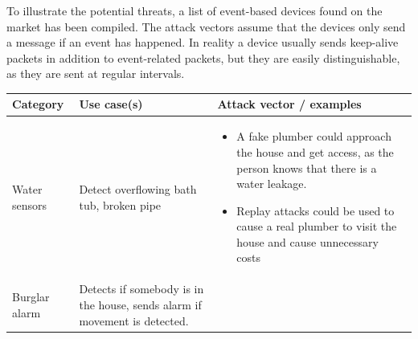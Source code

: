 {To illustrate the potential threats, a list of event-based devices
found on the market has been compiled. The attack vectors assume that
the devices only send a message if an event has happened. In reality a device usually sends keep-alive packets in addition to event-related packets, but they are easily distinguishable, as they are sent at regular intervals.

\begin{longtable}[c]{|l|l|l|}
\hline
\begin{minipage}[t]{0.20\columnwidth}\raggedright\strut
\textbf{Category}
\strut\end{minipage} &
\begin{minipage}[t]{0.30\columnwidth}\raggedright\strut
\textbf{Use case(s)}
\strut\end{minipage} &
\begin{minipage}[t]{0.40\columnwidth}\raggedright\strut
\textbf{Attack vector / examples}
\strut\end{minipage}\tabularnewline
\hline
\begin{minipage}[t]{0.20\columnwidth}\raggedright\strut
{Water sensors}
\strut\end{minipage} &
\begin{minipage}[t]{0.30\columnwidth}\raggedright\strut
{Detect overflowing bath tub, broken pipe}
\strut\end{minipage} &
\begin{minipage}[t]{0.40\columnwidth}\raggedright\strut
\begin{itemize}
\tightlist
\item
  {A fake plumber could approach the house and get access, as the person
  knows that there is a water leakage.}
\item
  {Replay attacks could be used to cause a real plumber to visit the
  house and cause unnecessary costs}
\end{itemize}
\strut\end{minipage}\tabularnewline
\hline
\begin{minipage}[t]{0.20\columnwidth}\raggedright\strut
{Burglar alarm}
\strut\end{minipage} &
\begin{minipage}[t]{0.30\columnwidth}\raggedright\strut
{Detects if somebody is in the house, sends alarm if movement is
detected.}
\strut\end{minipage} &
\begin{minipage}[t]{0.40\columnwidth}\raggedright\strut
\begin{itemize}

\end{itemize}
\end{minipage}
\end{longtable}}
